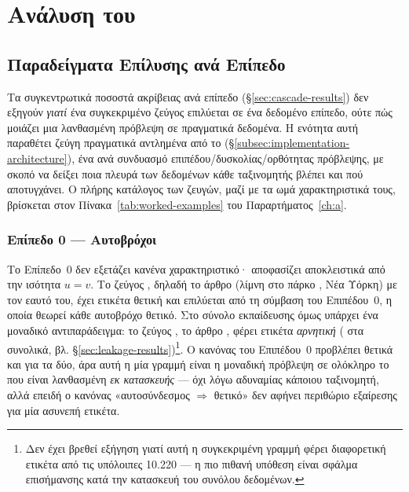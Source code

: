 \section{Ανάλυση του }
\label{sec:hard-residual}

\subsection{Παραδείγματα Επίλυσης ανά Επίπεδο}
\label{subsec:tier-examples}

Τα συγκεντρωτικά ποσοστά ακρίβειας ανά επίπεδο (\S\ref{sec:cascade-results}) δεν
εξηγούν \textit{γιατί} ένα συγκεκριμένο ζεύγος επιλύεται σε ένα δεδομένο επίπεδο,
ούτε πώς μοιάζει μια λανθασμένη πρόβλεψη σε πραγματικά δεδομένα.
Η ενότητα αυτή παραθέτει ζεύγη πραγματικά αντλημένα από το
\texttt{} (\S\ref{subsec:implementation-architecture}), ένα ανά
συνδυασμό επιπέδου/δυσκολίας/ορθότητας πρόβλεψης, με σκοπό να δείξει ποια πλευρά
των δεδομένων κάθε ταξινομητής βλέπει και πού αποτυγχάνει.
Ο πλήρης κατάλογος
των ζευγών, μαζί με τα ωμά χαρακτηριστικά τους, βρίσκεται στον
Πίνακα~\ref{tab:worked-examples} του Παραρτήματος~\ref{ch:a}.

\subsubsection{Επίπεδο 0 --- Αυτοβρόχοι}

Το Επίπεδο~0 δεν εξετάζει κανένα χαρακτηριστικό· αποφασίζει αποκλειστικά από την
ισότητα $u = v$.
Το ζεύγος , δηλαδή το άρθρο 
(λίμνη στο πάρκο , Νέα Υόρκη) με τον εαυτό του, έχει ετικέτα θετική
και επιλύεται από τη σύμβαση του Επιπέδου~0, η οποία θεωρεί κάθε αυτοβρόχο θετικό.
Στο σύνολο
εκπαίδευσης όμως υπάρχει ένα μοναδικό αντιπαράδειγμα: το ζεύγος
, το άρθρο , φέρει ετικέτα
\textit{αρνητική} (\SelfLoopsTrainNeg{} στα \SelfLoopsTrain{} συνολικά, βλ.
\S\ref{sec:leakage-results})\footnote{Δεν έχει βρεθεί εξήγηση γιατί αυτή η
συγκεκριμένη γραμμή φέρει διαφορετική ετικέτα από τις υπόλοιπες 10.220 --- η πιο
πιθανή υπόθεση είναι σφάλμα επισήμανσης κατά την κατασκευή του συνόλου δεδομένων.}.
Ο κανόνας του Επιπέδου~0 προβλέπει θετικά και για τα δύο, άρα αυτή η μία γραμμή
είναι η μοναδική πρόβλεψη σε ολόκληρο το  που είναι λανθασμένη \textit{εκ
κατασκευής} --- όχι λόγω αδυναμίας κάποιου ταξινομητή, αλλά επειδή ο κανόνας
«αυτοσύνδεσμος $\Rightarrow$ θετικό» δεν αφήνει περιθώριο εξαίρεσης για μία ασυνεπή
ετικέτα.


